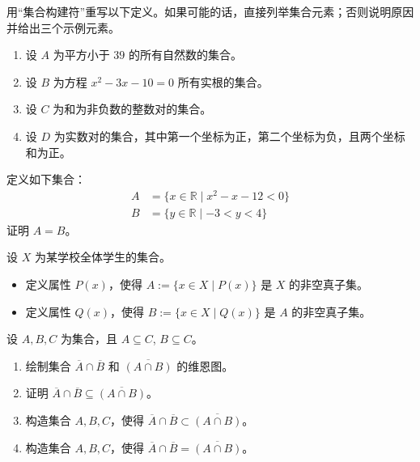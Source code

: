 \begin{exercise}
    用``集合构建符''重写以下定义。如果可能的话，直接列举集合元素；否则说明原因并给出三个示例元素。
    \begin{enumerate}[label=(\alph*)]
        \item 设 $A$ 为平方小于 $39$ 的所有自然数的集合。
        \item 设 $B$ 为方程 $x^2 - 3x - 10 = 0$ 所有实根的集合。
        \item 设 $C$ 为和为非负数的整数对的集合。
        \item 设 $D$ 为实数对的集合，其中第一个坐标为正，第二个坐标为负，且两个坐标和为正。
    \end{enumerate}
\end{exercise}

\begin{exercise}
    定义如下集合：
    \begin{align*}
        A &= \{x \in \mathbb{R} \mid x^2 - x - 12 < 0 \} \\
        B &= \{y \in \mathbb{R} \mid -3 < y < 4\}
    \end{align*}
    证明 $A = B$。
\end{exercise}

\begin{exercise}
    设 $X$ 为某学校全体学生的集合。
    \begin{itemize}
        \item 定义属性 $P(x)$，使得 $A := \{x \in X \mid P(x)\}$ 是 $X$ 的非空真子集。
        \item 定义属性 $Q(x)$，使得 $B := \{x \in X \mid Q(x)\}$ 是 $A$ 的非空真子集。
    \end{itemize}
\end{exercise}

\begin{exercise}
    设 $A, B, C$ 为集合，且 $A \subseteq C$, $B \subseteq C$。
    \begin{enumerate}[label=(\alph*)]
        \item 绘制集合 $\overline{A} \cap \overline{B}$ 和 $\overline{(A \cap B)}$ 的维恩图。
        \item 证明 $\overline{A} \cap \overline{B} \subseteq \overline{(A \cap B)}$。
        \item 构造集合 $A,B,C$，使得 $\overline{A} \cap \overline{B} \subset \overline{(A \cap B)}$。
        \item 构造集合 $A,B,C$，使得 $\overline{A} \cap \overline{B} = \overline{(A \cap B)}$。
    \end{enumerate}
\end{exercise}

